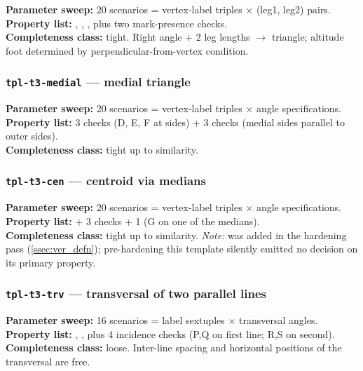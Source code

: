 \textbf{Parameter sweep:} 20 scenarios = vertex-label triples $\times$ (leg1, leg2) pairs.\\
\textbf{Property list:} , , , plus two mark-presence checks.\\
\textbf{Completeness class:} tight. Right angle + 2 leg lengths $\to$ triangle; altitude foot determined by perpendicular-from-vertex condition.

\subsubsection{\texttt{tpl-t3-medial} --- medial triangle}

\textbf{Parameter sweep:} 20 scenarios = vertex-label triples $\times$ angle specifications.\\
\textbf{Property list:} 3  checks (D, E, F at sides) + 3  checks (medial sides parallel to outer sides).\\
\textbf{Completeness class:} tight up to similarity.

\subsubsection{\texttt{tpl-t3-cen} --- centroid via medians}

\textbf{Parameter sweep:} 20 scenarios = vertex-label triples $\times$ angle specifications.\\
\textbf{Property list:}  + 3  checks + 1  (G on one of the medians).\\
\textbf{Completeness class:} tight up to similarity. \emph{Note:}  was added in the hardening pass (\cref{ssec:ver_defn}); pre-hardening this template silently emitted no decision on its primary property.

\subsubsection{\texttt{tpl-t3-trv} --- transversal of two parallel lines}

\textbf{Parameter sweep:} 16 scenarios = label sextuples $\times$ transversal angles.\\
\textbf{Property list:} , , plus 4  incidence checks (P,Q on first line; R,S on second).\\
\textbf{Completeness class:} loose. Inter-line spacing and horizontal positions of the transversal are free.

